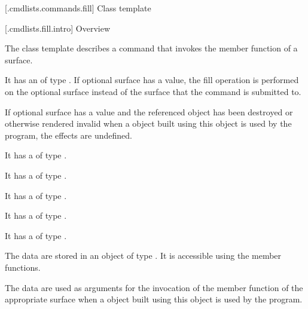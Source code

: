 
 [\iotwod.cmdlists.commands.fill] {Class template }

 [\iotwod.cmdlists.fill.intro] {Overview}

\pnum
{}%
The class template  describes a command that invokes the  member function of a surface.

\pnum
It has an  of type . If optional surface has a value, the fill operation is performed on the optional surface instead of the surface that the command is submitted to.

\pnum
If optional surface has a value and the referenced  object has been destroyed or otherwise rendered invalid when a  object built using this  object is used by the program, the effects are undefined.

\pnum
It has a  of type .

\pnum
It has a  of type .

\pnum
It has a  of type .

\pnum
It has a  of type .

\pnum
It has a  of type .

\pnum
The data are stored in an object of type . It is accessible using the  member functions.

\pnum
The data are used as arguments for the invocation of the  member function of the appropriate surface when a  object built using this  object is used by the program.


